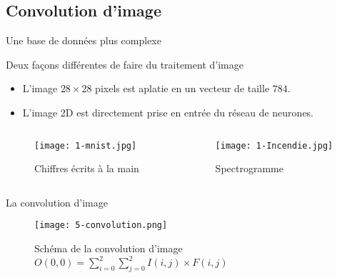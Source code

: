 \subsection{Convolution d'image}



\begin{frame}{Une base de données plus complexe}
    \begin{block}{Deux façons différentes de faire du traitement d'image}
        \begin{itemize}
            \item L'image $28\times28$ pixels est aplatie en un vecteur de taille $784$.
            \item L'image 2D est directement prise en entrée du réseau de neurones.
        \end{itemize}
    \end{block}
    \begin{columns}
        \begin{column}{0.5\textwidth}
            \begin{figure}
                \centering
                \texttt{[image: 1-mnist.jpg]}
                \caption{Chiffres écrits à la main}
            \end{figure}
        \end{column}
        \begin{column}{0.5\textwidth}
            \begin{figure}
                \centering
                \texttt{[image: 1-Incendie.jpg]}
                \caption{Spectrogramme}
            \end{figure}
        \end{column}
    \end{columns}
\end{frame}

\begin{frame}{La convolution d'image}
    \begin{figure}
        \centering
        \texttt{[image: 5-convolution.png]}
        \centering
        \caption{Schéma de la convolution d'image $O(0, 0) = \sum_{i=0}^{2}\sum_{j=0}^{2}I(i, j)\times F(i, j)$}
    \end{figure}
\end{frame}


